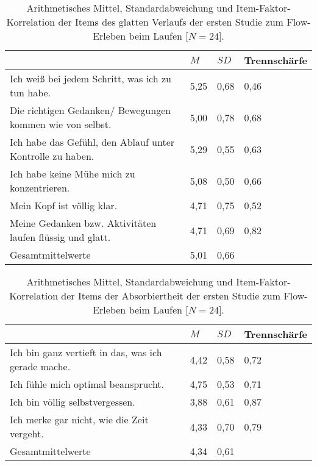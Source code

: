 \begin{table}
	[!htb] \centering \caption[Item-Faktor-Korrelation der Items des glatten Verlaufs (Laufstudie -- intraindividuell).]{Arithmetisches Mittel, Standardabweichung und Item-Faktor-Korrelation der Items des glatten Verlaufs der ersten Studie zum Flow-Erleben beim Laufen [$N = 24$].} \label{tab:glatter_verlauf_1} 
	\begin{tabularx}
		{ 
		\textwidth}{p{} p{} p{} p{}} \toprule & $M$ & $SD$ & Trennschärfe \\
		\midrule Ich weiß bei jedem Schritt, was ich zu tun habe. & 5,25 & 0,68 & 0,46 \\
		Die richtigen Gedanken/ Bewegungen kommen wie von selbst. & 5,00 & 0,78 & 0,68 \\
		Ich habe das Gefühl, den Ablauf unter Kontrolle zu haben. & 5,29 & 0,55 & 0,63 \\
		Ich habe keine Mühe mich zu konzentrieren. & 5,08 & 0,50 & 0,66 \\
		Mein Kopf ist völlig klar. & 4,71 & 0,75 & 0,52 \\
		Meine Gedanken bzw. Aktivitäten laufen flüssig und glatt. & 4,71 & 0,69 & 0,82 \\
		Gesamtmittelwerte & 5,01 & 0,66 & \\
		\bottomrule 
	\end{tabularx}
\end{table}
\begin{table}
	[!htb] \centering \caption[Item-Faktor-Korrelation der Items der Absorbiertheit (Laufstudie -- intraindividuell).]{Arithmetisches Mittel, Standardabweichung und Item-Faktor-Korrelation der Items der Absorbiertheit der ersten Studie zum Flow-Erleben beim Laufen [$N = 24$].} \label{tab:absorbiertheit_1} 
	\begin{tabularx}
		{ 
		\textwidth}{p{} p{} p{} p{}} \toprule & $M$ & $SD$ & Trennschärfe \\
		\midrule Ich bin ganz vertieft in das, was ich gerade mache. & 4,42 & 0,58 & 0,72 \\
		Ich fühle mich optimal beansprucht. & 4,75 & 0,53 & 0,71 \\
		Ich bin völlig selbstvergessen. & 3,88 & 0,61 & 0,87 \\
		Ich merke gar nicht, wie die Zeit vergeht. & 4,33 & 0,70 & 0,79 \\
		Gesamtmittelwerte & 4,34 & 0,61 & \\
		\bottomrule 
	\end{tabularx}
\end{table}

